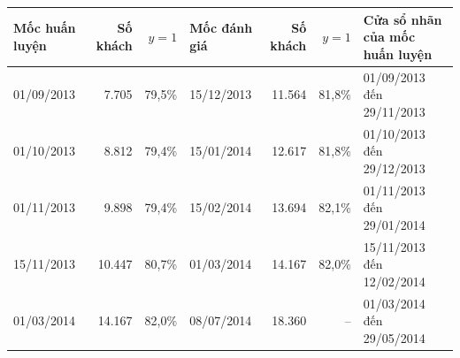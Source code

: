 \begin{tabular}{lrrlrrl}
\toprule
Mốc huấn luyện & Số khách & $y=1$ & Mốc đánh giá & Số khách & $y=1$ & Cửa sổ nhãn của mốc huấn luyện \\
\midrule
01/09/2013 & 7.705 & 79,5\% & 15/12/2013 & 11.564 & 81,8\% & 01/09/2013 đến 29/11/2013 \\
01/10/2013 & 8.812 & 79,4\% & 15/01/2014 & 12.617 & 81,8\% & 01/10/2013 đến 29/12/2013 \\
01/11/2013 & 9.898 & 79,4\% & 15/02/2014 & 13.694 & 82,1\% & 01/11/2013 đến 29/01/2014 \\
15/11/2013 & 10.447 & 80,7\% & 01/03/2014 & 14.167 & 82,0\% & 15/11/2013 đến 12/02/2014 \\
01/03/2014 & 14.167 & 82,0\% & 08/07/2014 & 18.360 & -- & 01/03/2014 đến 29/05/2014 \\
\bottomrule
\end{tabular}
